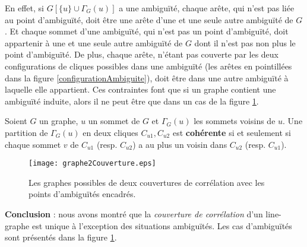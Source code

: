 En effet, si $G[\{u\} \cup \Gamma_{G}(u)]$ a une ambigu\"{i}t\'e, chaque ar\^ete, qui n'est pas li\'ee au point d'ambigu\"{i}t\'e, doit \^etre une ar\^ete d'une et une seule autre ambigu\"{i}t\'e de $G$. Et chaque sommet d'une ambigu\"{i}t\'e, qui n'est pas un point d'ambigu\"{i}t\'e, doit appartenir \`a une et une seule autre ambigu\"{i}t\'e de $G$ dont il n'est pas non  plus le point d'ambigu\"{i}t\'e.
De plus, chaque ar\^ete, n'\'etant pas couverte par les deux configurations de cliques possibles dans une ambigu\"{i}t\'e (les ar\^etes en pointill\'ees dans la figure \ref{configurationAmbiguite}), doit \^etre dans une autre ambigu\"{i}t\'e \`a laquelle elle appartient.
Ces contraintes font que si un graphe contient une ambigu\"{i}t\'e induite, alors il ne peut \^etre que dans un cas de la figure  \ref{graphe2Couverture}.

\begin{definition}
\label{cliquesCoherentes}
Soient $G$ un graphe, $u$ un sommet de $G$ et $\Gamma_G(u)$ les sommets voisins de $u$. 
\newline
Une partition de $\Gamma_G(u)$ en deux cliques $C_{u1}, C_{u2}$ est {\bf coh\'erente } si et seulement si chaque sommet $v$ de $C_{u1}$ (resp. $C_{u2}$) a au plus un voisin dans $C_{u2}$  (resp. $C_{u1}$).
\end{definition}

\begin{figure}[htb!] \vspace{-1.5em}
\centering
\texttt{[image: graphe2Couverture.eps]}
\caption{ Les graphes possibles de deux couvertures de corr\'elation avec les points d'ambigu\"{i}t\'es encadr\'es. }
\label{graphe2Couverture} 
\end{figure}
\FloatBarrier


{\bf Conclusion} : 
nous avons montr\'e que la {\em couverture de corr\'elation} d'un line-graphe est unique \`a l'exception des situations ambigu\"{i}t\'es. Les cas d'ambigu\"{i}t\'es sont pr\'esent\'es dans la figure \ref{graphe2Couverture}.


